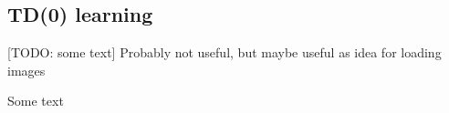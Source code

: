 \documentclass[a4paper]{article}
\begin{document}
\subsection*{TD(0) learning}
[TODO: some text]
Probably not useful, but maybe useful as idea for loading images

\begin{minipage}{\columnwidth}
\makeatletter
\newcommand{\@captype}{figure}
\makeatother
\centering
\captionsetup[subfigure]{labelformat=empty}
 \qquad \qquad%
\caption{Some text}
\label{fig-data-prep}
\end{minipage}
\end{document}
